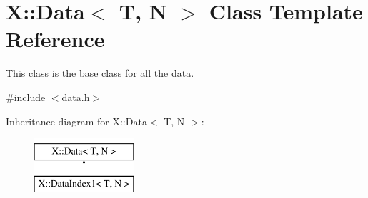 \hypertarget{class_x_1_1_data}{\section{X\-:\-:Data$<$ T, N $>$ Class Template Reference}
\label{class_x_1_1_data}
}


This class is the base class for all the data.  




{\ttfamily \#include $<$data.\-h$>$}

Inheritance diagram for X\-:\-:Data$<$ T, N $>$\-:\begin{figure}[H]
\begin{center}
\leavevmode
\includegraphics[height=2.000000cm]{class_x_1_1_data}
\end{center}
\end{figure}
